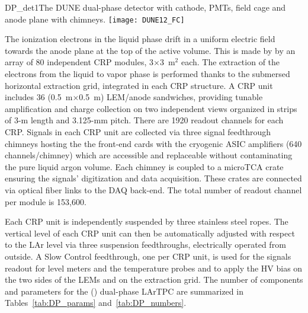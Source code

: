  
\begin{cdrfigure}{DP_det1}{The DUNE dual-phase 
detector with cathode, PMTs, field cage and anode plane with chimneys.}
\texttt{[image: DUNE12\_FC]}
\end{cdrfigure}

The ionization electrons in the liquid phase drift  in a uniform electric field towards the anode plane at the top of the active
volume. This is made by by an array of 80 independent CRP modules, 3$\times$3~m$^2$ each.
The extraction of the electrons from the liquid to vapor phase is performed thanks to the submersed horizontal extraction grid, 
integrated in each CRP structure. A CRP unit includes 36 (0.5~m$\times$0.5~m) LEM/anode sandwiches, providing tunable
amplification and charge collection on two independent views organized in strips of 3-m length and 3.125-mm pitch. There are
1920 readout channels for each CRP. Signals in each CRP unit are collected via three signal feedthrough chimneys hosting the
the front-end cards with the cryogenic ASIC amplifiers (640 channels/chimney) which are accessible and replaceable without
contaminating the pure liquid argon volume. Each chimney is coupled to a microTCA crate ensuring the signals' digitization and 
data acquisition. These crates are connected  via optical fiber links to the DAQ back-end. The total number of readout channel 
per  module is 153,600.
 
Each CRP unit is independently suspended by three stainless steel ropes. The vertical level of each CRP unit can then be automatically
adjusted with respect to the LAr level via three suspension feedthroughs, electrically operated from outside. A Slow Control feedthrough, 
one per CRP unit, is used for the signals readout for level meters and the temperature probes and to apply the HV bias on the two
sides of the LEMs and on the extraction grid. The number of components and parameters for the  ()
dual-phase LArTPC are summarized in Tables~\ref{tab:DP_params}
and~\ref{tab:DP_numbers}.

